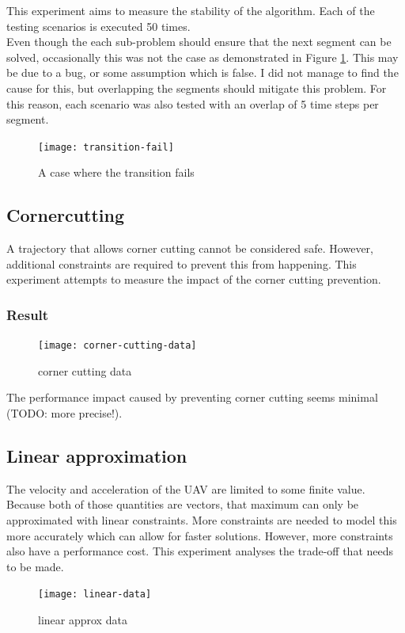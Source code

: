 This experiment aims to measure the stability of the algorithm. Each of the testing scenarios is executed 50 times. \\

Even though the each sub-problem should ensure that the next segment can be solved, occasionally this was not the case as demonstrated in Figure \ref{fig:transition-fail}. This may be due to a bug, or some assumption which is false. I did not manage to find the cause for this, but overlapping the segments should mitigate this problem. For this reason, each scenario was also tested with an overlap of 5 time steps per segment.
\begin{figure}[]
	\centering
	\texttt{[image: transition-fail]}
	\caption{A case where the transition fails}
	\label{fig:transition-fail}
\end{figure}





\clearpage
\subsection{Cornercutting}
\label{subsec:cutting}
A trajectory that allows corner cutting cannot be considered safe. However, additional constraints are required to prevent this from happening. This experiment attempts to measure the impact of the corner cutting prevention.


\subsubsection{Result}
\begin{figure}[]
	\centering
	\texttt{[image: corner-cutting-data]}
	\caption{corner cutting data}
	\label{fig:corner-data}
\end{figure}

The performance impact caused by preventing corner cutting seems minimal (TODO: more precise!).


\clearpage
\subsection{Linear approximation}
\label{subsec:lin-approx}
The velocity and acceleration of the UAV are limited to some finite value. Because both of those quantities are vectors, that maximum can only be approximated with linear constraints. More constraints are needed to model this more accurately which can allow for faster solutions. However, more constraints also have a performance cost. This experiment analyses the trade-off that needs to be made.
\begin{figure}[]
	\centering
	\texttt{[image: linear-data]}
	\caption{linear approx data}
	\label{fig:linear-approx-data}
\end{figure}



